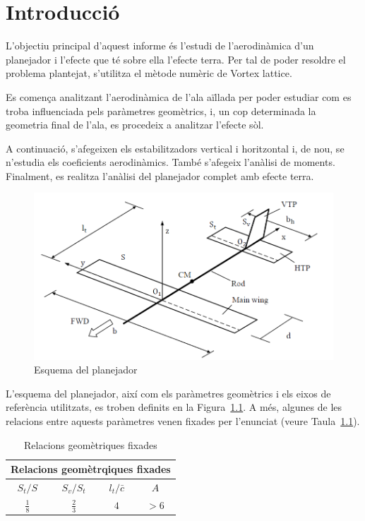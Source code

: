 \chapter{Introducció}

L'objectiu principal d'aquest informe és l'estudi de l'aerodinàmica d'un planejador i l'efecte que té sobre ella l'efecte terra. Per tal de poder resoldre el problema plantejat, s'utilitza el mètode numèric de Vortex lattice.

Es comença analitzant l'aerodinàmica de l'ala aïllada per poder estudiar com es troba influenciada pels paràmetres geomètrics, i, un cop determinada la geometria final de l'ala, es procedeix a analitzar l'efecte sòl.

A continuació, s'afegeixen els estabilitzadors vertical i horitzontal i, de nou, se n'estudia els coeficients aerodinàmics. També s'afegeix l'anàlisi de moments. Finalment, es realitza l'anàlisi del planejador complet amb efecte terra.

\begin{figure}[H]
	\centering
	\includegraphics[scale=0.5]{plots/enunciat.png}
	\caption{Esquema del planejador}
	\label{enunciat}
\end{figure}

L'esquema del planejador, així com els paràmetres geomètrics i els eixos de referència utilitzats, es troben definits en la Figura~\ref{enunciat}. A més, algunes de les relacions entre aquests paràmetres venen fixades per l'enunciat (veure Taula~\ref{tab:Dades}).

\begin{table} [H]
	\centering
	\begin{tabular}{| c | c | c | c |}	
		\hline
		\multicolumn{4}{|c|}{\bfseries Relacions geomètrqiques fixades} \\
		\hline\hline
	\textbf{$S_{t}/S$} & \textbf{$S_{v}/S_{t}$} & \textbf{$l_{t}/\bar{c}$} & \textbf{$A$}\\ \hline 
		$\frac{1}{8}$ & $\frac{2}{3}$ & $4$ & $>6$\\
		\hline	
	\end{tabular}
\caption{Relacions geomètriques fixades} \label{tab:Dades}
\end{table}



